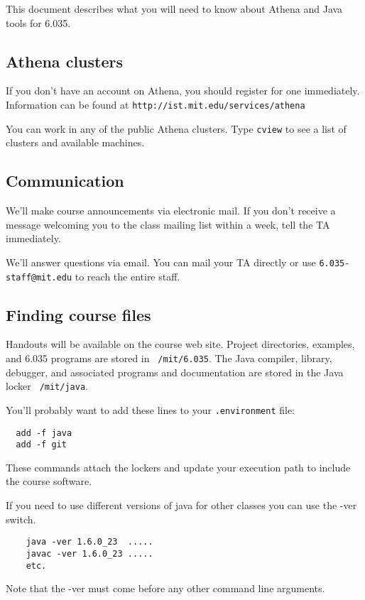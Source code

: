 



This document describes what you will need to know about Athena and
Java tools for 6.035.

\subsection*{Athena clusters}

If you don't have an account on Athena, you should register for one
immediately.  Information can be found at {\tt http://ist.mit.edu/services/athena}

You can work in any of the public Athena clusters.  Type {\tt cview} to see a
list of clusters and available machines.

\subsection*{Communication}

We'll make course announcements via electronic mail.  If you don't
receive a message welcoming you to the class mailing list within a
week, tell the TA immediately.

We'll answer questions via email.  You can mail your TA directly
or use {\tt 6.035-staff@mit.edu} to reach the entire staff.

\subsection*{Finding course files}

Handouts will be available on the course web site.  Project
directories, examples, and 6.035 programs are stored in {\tt
/mit/6.035}.  The Java compiler, library, debugger, and associated
programs and documentation are stored in the Java locker {\tt
/mit/java}.

You'll probably want to add these lines to your {\tt .environment} file:
\begin{verbatim}
  add -f java
  add -f git
\end{verbatim}

These commands attach the lockers and update your execution path
to include the course software.

If you need to use different versions of java for other classes you
can use the -ver switch.
\begin{verbatim}
    java -ver 1.6.0_23  .....
    javac -ver 1.6.0_23 .....
    etc.
\end{verbatim} 
Note that the -ver must come before any other command line arguments.

